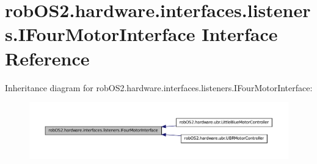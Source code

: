 \hypertarget{interfacerob_o_s2_1_1hardware_1_1interfaces_1_1listeners_1_1_i_four_motor_interface}{
\section{robOS2.hardware.interfaces.listeners.IFourMotorInterface Interface Reference}
\label{interfacerob_o_s2_1_1hardware_1_1interfaces_1_1listeners_1_1_i_four_motor_interface}
}


Inheritance diagram for robOS2.hardware.interfaces.listeners.IFourMotorInterface:\nopagebreak
\begin{figure}[H]
\begin{center}
\leavevmode
\includegraphics[width=400pt]{interfacerob_o_s2_1_1hardware_1_1interfaces_1_1listeners_1_1_i_four_motor_interface__inherit__graph}
\end{center}
\end{figure}
